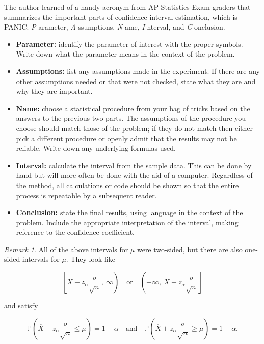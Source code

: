 \documentclass[]{book}
\providecommand{\tightlist}{%
  \setlength{\itemsep}{0pt}\setlength{\parskip}{0pt}}
\numberwithin{equation}{chapter}
\numberwithin{figure}{chapter}
\theoremstyle{plain}
\theoremstyle{definition}
\theoremstyle{remark}
\theoremstyle{definition}
\theoremstyle{definition}
\theoremstyle{remark}
\newtheorem*{remark}{Remark}
\begin{document}
The author learned of a handy acronym from AP Statistics Exam graders
that summarizes the important parts of confidence interval estimation,
which is PANIC: \emph{P}-arameter, \emph{A}-ssumptions, \emph{N}-ame,
\emph{I}-nterval, and \emph{C}-onclusion.

\begin{itemize}
\tightlist
\item
  \textbf{Parameter:} identify the parameter of interest with the proper
  symbols. Write down what the parameter means in the context of the
  problem.
\item
  \textbf{Assumptions:} list any assumptions made in the experiment. If
  there are any other assumptions needed or that were not checked, state
  what they are and why they are important.
\item
  \textbf{Name:} choose a statistical procedure from your bag of tricks
  based on the answers to the previous two parts. The assumptions of the
  procedure you choose should match those of the problem; if they do not
  match then either pick a different procedure or openly admit that the
  results may not be reliable. Write down any underlying formulas used.
\item
  \textbf{Interval:} calculate the interval from the sample data. This
  can be done by hand but will more often be done with the aid of a
  computer. Regardless of the method, all calculations or code should be
  shown so that the entire process is repeatable by a subsequent reader.
\item
  \textbf{Conclusion:} state the final results, using language in the
  context of the problem. Include the appropriate interpretation of the
  interval, making reference to the confidence coefficient.
\end{itemize}

\bigskip

\begin{remark}
All of the above intervals for \(\mu\) were two-sided, but there are
also one-sided intervals for \(\mu\). They look like

\begin{equation}
\left[\overline{X}-z_{\alpha}\frac{\sigma}{\sqrt{n}},\ \infty\right)\quad \mbox{or}\quad \left(-\infty,\ \overline{X}+z_{\alpha}\frac{\sigma}{\sqrt{n}}\right]
\end{equation}

and satisfy

\begin{equation}
\mathbb{P}\left(\overline{X}-z_{\alpha}\frac{\sigma}{\sqrt{n}}\leq\mu\right)=1-\alpha\quad \mbox{and}\quad \mathbb{P}\left(\overline{X}+z_{\alpha}\frac{\sigma}{\sqrt{n}}\geq\mu\right)=1-\alpha.
\end{equation}
\end{remark}
\end{document}
